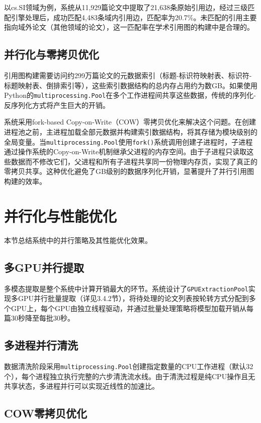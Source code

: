 以cs.SI领域为例，系统从11,929篇论文中提取了21,638条原始引用边，经过三级匹配引擎处理后，成功匹配4,483条域内引用边，匹配率为20.7\%。未匹配的引用主要指向域外论文（其他领域的论文），这一匹配率在学术引用图的构建中是合理的。

\subsection{并行化与零拷贝优化}

引用图构建需要访问约299万篇论文的元数据索引（标题-标识符映射表、标识符-标题映射表、倒排索引等），这些索引数据结构的总内存占用约为数GB。如果使用Python的\texttt{multiprocessing.Pool}在多个工作进程间共享这些数据，传统的序列化-反序列化方式将产生巨大的开销。

系统采用fork-based Copy-on-Write（COW）零拷贝优化来解决这个问题。在创建进程池之前，主进程加载全部元数据并构建索引数据结构，将其存储为模块级别的全局变量。当\texttt{multiprocessing.Pool}使用\texttt{fork()}系统调用创建子进程时，子进程通过操作系统的Copy-on-Write机制继承父进程的内存空间。由于子进程只读取这些数据而不修改它们，父进程和所有子进程共享同一份物理内存页，实现了真正的零拷贝共享。这种优化避免了GB级别的数据序列化开销，显著提升了并行引用图构建的效率。

\section{并行化与性能优化}

本节总结系统中的并行策略及其性能优化效果。

\subsection{多GPU并行提取}

多模态提取是整个系统中计算开销最大的环节。系统设计了\texttt{GPUExtractionPool}实现多GPU并行批量提取（详见3.4.2节），将待处理的论文列表按轮转方式分配到多个GPU上，每个GPU由独立线程驱动，并通过批量处理策略将模型加载开销从每篇30秒降至每批30秒。

\subsection{多进程并行清洗}

数据清洗阶段采用\texttt{multiprocessing.Pool}创建指定数量的CPU工作进程（默认32个），每个进程独立执行完整的六步清洗流水线。由于清洗过程是纯CPU操作且无共享状态，多进程并行可以实现近线性的加速比。

\subsection{COW零拷贝优化}

